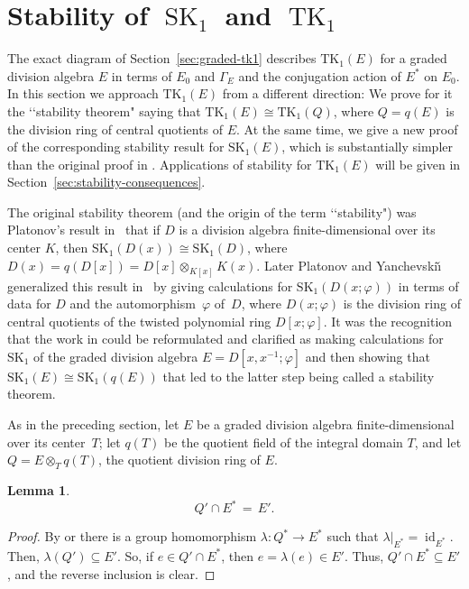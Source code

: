 \documentclass[11pt]{article}
\numberwithin{equation}{section}
\theoremstyle{plain}
\newtheorem{lemma}[theorem]{Lemma}
\theoremstyle{remark}
\newcommand{\opn}{\operatorname}
\newcommand{\SK}{\opn{SK_1}}
\newcommand{\TK}{\opn{TK_1}}
\begin{document}
\section{Stability of $\operatorname{SK}_1$ and $\operatorname{TK}_1$}\label{sec:stability}

The exact diagram of Section~\ref{sec:graded-tk1} describes $\TK(E)$ for a graded division algebra $E$
in terms of $E_0$ and $\Gamma_E$
and the conjugation action of $E^*$ on $E_0$. In this section we approach $\TK(E)$ from a different 
direction:  We prove for it the \lq\lq stability theorem" saying that $\TK(E) \cong \TK(Q)$, where 
$Q = q(E)$ is the division ring of central quotients of $E$.  At the same time, we give a new proof of 
the corresponding stability result for $\SK(E)$, which is substantially simpler than the original proof in 
 \cite[Th.~5.7]{hazrat-wadsworth-2011}. Applications of  
stability for $\TK(E)$ will be given in Section~\ref{sec:stability-consequences}.

The original stability theorem (and the origin of the term \lq\lq stability") was Platonov's result 
in~\cite{platonov-stability-1976} that if $D$ is a division algebra finite-dimensional over its center $K$, 
then ${\SK(D(x)) \cong \SK(D)}$, where $D(x) = q(D[x]) = D[x] \otimes_{K[x]}K(x)$.  Later Platonov and 
Yanchevski\v{\i} generalized this result in~\cite{platonov-yanchevskii-1979} by giving calculations for 
$\SK(D(x;\varphi))$ in terms of data for 
$D$ and the automorphism~$\varphi$ of~$D$, where $D(x; \varphi)$ is the division ring of 
central quotients of the twisted polynomial ring $D[x;\varphi]$.  It was the recognition 
that the work in \cite{platonov-yanchevskii-1979} could be reformulated and clarified as making calculations
for $\SK$ of the graded division algebra $E = D[x, x^{-1};\varphi]$ and then showing that 
$\SK(E) \cong \SK(q(E))$ that led to the latter step being called a stability theorem.

As in the preceding section, let $E$ be a graded division algebra finite-dimensional over its 
center~$T$; let $q(T)$ be the quotient field  of the integral domain $T$, and let 
$Q= E \otimes_T q(T)$, the  quotient division ring of $E$. 


\begin{lemma}
\label{lem:Q'capE*}
$$
Q' \cap E^* \, = \, E'.
$$
\end{lemma}

\begin{proof}
By \cite[p.~124]{hazrat-wadsworth-2011} or \cite[Sec.~3.2.5]{tignol-wadsworth-2015} there is a group 
homomorphism $\lambda\colon Q^* \to E^*$ such that $\lambda |_{E^*} = \opn{id}_{E^*}$. 
Then, $\lambda(Q') \subseteq E'$. 
So, if  $e \in Q' \cap E^*$, then $e = \lambda(e) \in E'$.  Thus, $Q' \cap E^* \subseteq E'$, and the reverse
inclusion is clear.
\end{proof}
\end{document}
